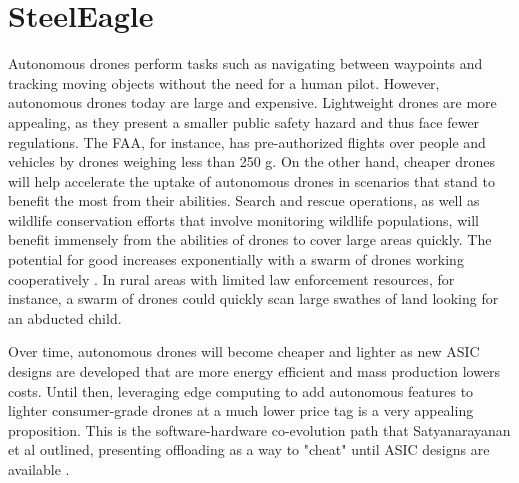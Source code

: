\section{SteelEagle}
\label{sec:steeleagle-bg}

Autonomous drones perform tasks such as navigating between waypoints and
tracking moving objects without the need for a human pilot.  However,
autonomous drones today are large and expensive. Lightweight drones are more
appealing, as they present a smaller public safety hazard and thus face fewer
regulations. The FAA, for instance, has pre-authorized flights over people and
vehicles by drones weighing less than 250 g. On the other hand, cheaper drones
will help accelerate the uptake of autonomous drones in scenarios that stand to
benefit the most from their abilities. Search and rescue operations, as well as
wildlife conservation efforts that involve monitoring wildlife populations,
will benefit immensely from the abilities of drones to cover large areas
quickly. The potential for good increases exponentially with a swarm of drones
working cooperatively \cite{scherer2015}. In rural areas with limited law
enforcement resources, for instance, a swarm of drones could quickly scan
large swathes of land looking for an abducted child.

Over time, autonomous drones will
become cheaper and lighter as new ASIC designs are developed that are more
energy efficient and mass production lowers costs. Until then, leveraging edge
computing to add autonomous features to lighter consumer-grade drones at a much
lower price tag is a very appealing proposition. This is the software-hardware
co-evolution path that Satyanarayanan et al outlined, presenting offloading as
a way to "cheat" until ASIC designs are available \cite{satya21}.

